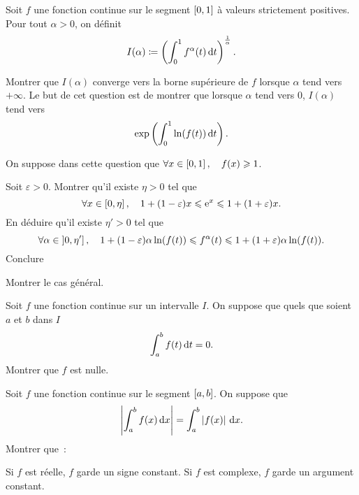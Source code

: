 \documentclass{magnolia}
\begin{document}
Soit $f$ une fonction continue sur le segment $\left[0,1\right]$ à valeurs
strictement positives. Pour tout $\alpha>0$, on définit
$$I(\alpha)\coloneqq \left(\int_{0}^{1} f^\alpha(t)\,\text{d}t\right)^\frac{1}{\alpha}.$$
\begin{questions}
\question Montrer que $I(\alpha)$ converge vers la borne supérieure de
  $f$ lorsque $\alpha$ tend vers $+\infty$.
\question Le but de cet question est de montrer que lorsque $\alpha$ tend vers
  $0$, $I(\alpha)$ tend vers
  \[\exp\left(\int_{0}^{1} \ln(f(t))\,\text{d}t\right).\]
  \begin{questions}
  \question On suppose dans cette question que $\forall x\in\left[0,1\right]
    ,\quad f(x)\geqslant1$.
    \begin{questions}
    \question Soit $\varepsilon>0$. Montrer qu'il existe $\eta>0$ tel que
      $$\forall x\in\left[0,\eta\right] ,\quad 1+(1-\varepsilon)x\leqslant {\rm e}^x
        \leqslant 1+(1+\varepsilon)x.$$
    \question En déduire qu'il existe $\eta'>0$ tel que
      \[\forall \alpha\in\left]0,\eta'\right] ,\quad
        1+(1-\varepsilon)\alpha\ln(f(t)) \leqslant f^{\alpha} (t) \leqslant 
        1+(1+\varepsilon)\alpha\ln(f(t)).\]
    \question Conclure
    \end{questions}
  \question Montrer le cas général.
  \end{questions}
\end{questions}


Soit $f$ une fonction continue sur un intervalle $I$. On suppose que
quels que soient $a$ et $b$ dans $I$
\[\int_{a}^{b} f(t)\,\text{d}t=0.\]
Montrer que $f$ est nulle.


Soit $f$ une fonction continue sur le segment $\left[a,b\right]$. On suppose
que
\[\left|\int_{a}^{b} f(x)\,\text{d}x\right|=\int_{a}^{b} \left|f(x)\right|\,\text{d}x.\]
Montrer que~:
\begin{questions}
\question Si $f$ est réelle, $f$ garde un signe constant.
\question Si $f$ est complexe, $f$ garde un argument constant.
\end{questions}

\end{document}
